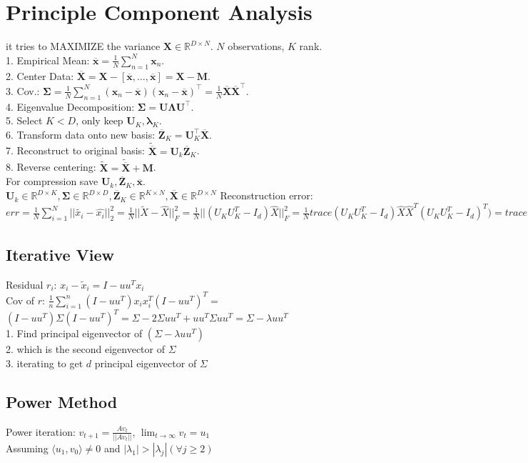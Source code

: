 \section{Principle Component Analysis}
it tries to MAXIMIZE the variance
$\mathbf{X} \in \mathbb{R}^{D \times N}$. $N$ observations, $K$ rank.\\
1. Empirical Mean: $\overline{\mathbf{x}} = \frac{1}{N} \sum_{n=1}^N \mathbf{x}_n$.\\
2. Center Data: $\overline{\mathbf{X}} = \mathbf{X} - [\overline{\mathbf{x}}, \ldots, \overline{\mathbf{x}}] = \mathbf{X} - \mathbf{M}$.\\
3. Cov.: $\boldsymbol{\Sigma} = \frac{1}{N	} \sum_{n=1}^N (\mathbf{x}_n - \overline{\mathbf{x}}) (\mathbf{x}_n - \overline{\mathbf{x}})^\top = \frac{1}{N} \overline{\mathbf{X}}\overline{\mathbf{X}}^\top$.\\
4. Eigenvalue Decomposition: $\boldsymbol{\Sigma} = \mathbf{U} \boldsymbol{\Lambda} \mathbf{U}^\top$.\\
5. Select $K < D$, only keep $\mathbf{U}_K, \boldsymbol{\lambda}_K$.\\
6. Transform data onto new basis: $\overline{\mathbf{Z}}_K = \mathbf{U}_K^\top \overline{\mathbf{X}}$.\\
7. Reconstruct to original basis: $\tilde{\overline{\mathbf{X}}} = \mathbf{U}_k \overline{\mathbf{Z}}_K$.\\
8. Reverse centering: $\tilde{\mathbf{X}} = \tilde{\overline{\mathbf{X}}} + \mathbf{M}$.\\
For compression save $\mathbf{U}_k, \overline{\mathbf{Z}}_K, \overline{\mathbf{x}}$.\\
$\mathbf{U}_k \in \mathbb{R}^{D \times K}, \boldsymbol{\Sigma} \in \mathbb{R}^{D \times D}, \overline{\mathbf{Z}}_K \in \mathbb{R}^{K \times N}, \overline{\mathbf{X}} \in \mathbb{R}^{D \times N}$
Reconstruction error: $err = \frac{1}{N}\sum_{i=1}^N ||\tilde{x_i}-\hat{x_i}||_2^2 = \frac{1}{N}||\tilde{X}-\hat{X}||_F^2 = \frac{1}{N}||(U_KU_K^T-I_d)\hat{X}||_F^2= \frac{1}{N}trace(U_KU_K^T-I_d)\hat{X}\hat{X}^T(U_KU_K^T-I_d)^T) = trace(U_KU_K^T-I_d)U\Lambda U^T(U_KU_K^T-I_d)) = trace([U_k;0]-U)\Lambda([U_K;0]-U)^T) = trace(\sum_{i=K+1}^D\lambda_iu_iu_i^T)= \sum_{i=K+1}^D\lambda_i$

\subsection*{Iterative View}
Residual $r_i$: $x_i - \tilde{x}_i = I - uu^T  x_i$\\
Cov of $r$:  $\frac{1}{n} \sum_{i=1}^n (I-uu^T)x_i x_i^T (I-uu^T)^T =$ \\
$(I-uu^T) \Sigma (I-uu^T)^T = \Sigma - 2\Sigma u u^T + u u^T \Sigma u u ^T = \Sigma - \lambda uu^T$ \\
1. Find principal eigenvector of $(\Sigma - \lambda u u^T)$\\
2. which is the second eigenvector of $\Sigma$\\
3. iterating to get $d$ principal eigenvector of $\Sigma$

\subsection*{Power Method}
Power iteration: $v_{t+1} = \frac{Av_t}{||Av_t||}$, $\lim_{t \rightarrow \infty} v_t = u_1$\\
Assuming $\langle u_1, v_0 \rangle \not = 0$ and $|\lambda_1| > |\lambda_j| (\forall j \geq 2)$
